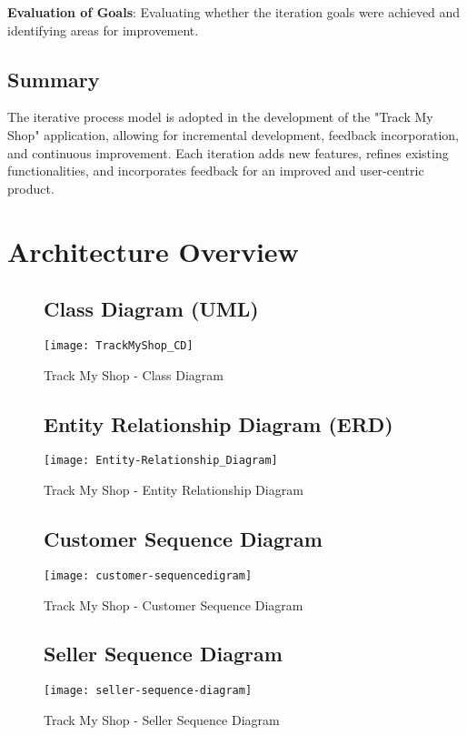 \textbf{Evaluation of Goals}:
Evaluating whether the iteration goals were achieved and identifying areas for improvement.

\subsection{Summary}

The iterative process model is adopted in the development of the "Track My Shop" application, allowing for incremental development, feedback incorporation, and continuous improvement. Each iteration adds new features, refines existing functionalities, and incorporates feedback for an improved and user-centric product.






\section{Architecture Overview}


\begin{figure}[h]
	\subsection{Class Diagram (UML) }
	\centering
	\texttt{[image: TrackMyShop\_CD]}
	\caption{Track My Shop - Class Diagram}
\end{figure}

\pagebreak
\begin{figure}[h]
	\subsection{Entity Relationship Diagram (ERD) }
	\vspace{2cm}
	\centering
	\texttt{[image: Entity-Relationship\_Diagram]}
	\caption{Track My Shop - Entity Relationship Diagram}
\end{figure}

\pagebreak
\begin{figure}[h]
	\subsection{Customer Sequence Diagram }
	\centering
	\texttt{[image: customer-sequencedigram]}
	\caption{Track My Shop - Customer Sequence Diagram}
\end{figure}

\pagebreak
\begin{figure}[h]
	\subsection{Seller Sequence Diagram}
	\centering
	\texttt{[image: seller-sequence-diagram]}
	\caption{Track My Shop - Seller Sequence Diagram}
\end{figure}


